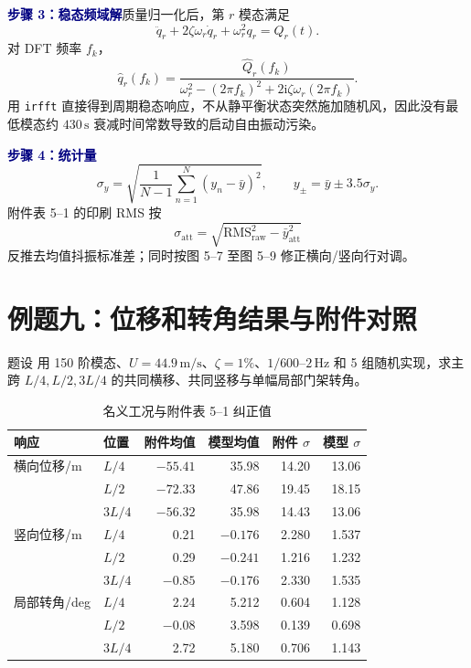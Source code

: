 \documentclass[11pt,a4paper]{article}
\newcommand{\Step}[1]{\par\medskip\noindent\textcolor{Navy}{\bfseries 步骤 #1}\quad}
\begin{document}
\Step{3：稳态频域解}质量归一化后，第 $r$ 模态满足
\begin{equation}
\ddot q_r+2\zeta\omega_r\dot q_r+\omega_r^2q_r=Q_r(t).
\end{equation}
对 DFT 频率 $f_k$，
\begin{equation}
\hat q_r(f_k)=
\frac{\hat Q_r(f_k)}{\omega_r^2-(2\pi f_k)^2+2\mathrm i\zeta\omega_r(2\pi f_k)}.
\end{equation}
用 \texttt{irfft} 直接得到周期稳态响应，不从静平衡状态突然施加随机风，因此没有最低模态约 $430\,\mathrm s$ 衰减时间常数导致的启动自由振动污染。

\Step{4：统计量}
\begin{equation}
\sigma_y=\sqrt{\frac{1}{N-1}\sum_{n=1}^{N}(y_n-\bar y)^2},
\qquad y_{\pm}=\bar y\pm3.5\sigma_y.
\end{equation}
附件表 5--1 的印刷 RMS 按
\begin{equation}
\sigma_{\mathrm{att}}=\sqrt{\mathrm{RMS}_{\mathrm{raw}}^2-\bar y_{\mathrm{att}}^2}
\end{equation}
反推去均值抖振标准差；同时按图 5--7 至图 5--9 修正横向/竖向行对调。

\section{例题九：位移和转角结果与附件对照}
\begin{problem}{题设}
用 150 阶模态、$U=44.9\,\mathrm{m/s}$、$\zeta=1\%$、$1/600$--$2\,\mathrm{Hz}$ 和 5 组随机实现，求主跨 $L/4,L/2,3L/4$ 的共同横移、共同竖移与单幅局部门架转角。
\end{problem}

\begin{table}[H]
\centering
\caption{名义工况与附件表 5--1 纠正值}
\small
\begin{tabular}{llrrrr}
\toprule
响应 & 位置 & 附件均值 & 模型均值 & 附件 $\sigma$ & 模型 $\sigma$ \\
\midrule
横向位移/m & $L/4$  & $-55.41$ & 35.98 & 14.20 & 13.06 \\
             & $L/2$  & $-72.33$ & 47.86 & 19.45 & 18.15 \\
             & $3L/4$ & $-56.32$ & 35.98 & 14.43 & 13.06 \\
\addlinespace
竖向位移/m & $L/4$  & 0.21  & $-0.176$ & 2.280 & 1.537 \\
             & $L/2$  & 0.29  & $-0.241$ & 1.216 & 1.232 \\
             & $3L/4$ & $-0.85$ & $-0.176$ & 2.330 & 1.535 \\
\addlinespace
局部转角/deg & $L/4$  & 2.24  & 5.212 & 0.604 & 1.128 \\
              & $L/2$  & $-0.08$ & 3.598 & 0.139 & 0.698 \\
              & $3L/4$ & 2.72  & 5.180 & 0.706 & 1.143 \\
\bottomrule
\end{tabular}
\end{table}
\end{document}
